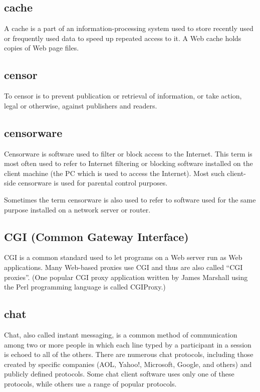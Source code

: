 \subsection{cache}

A cache is a part of an information-processing system used to store
recently used or frequently used data to speed up repeated access to it.
A Web cache holds copies of Web page files.

\subsection{censor}

To censor is to prevent publication or retrieval of information, or take
action, legal or otherwise, against publishers and readers.

\subsection{censorware}

Censorware is software used to filter or block access to the Internet.
This term is most often used to refer to Internet filtering or blocking
software installed on the client machine (the PC which is used to access
the Internet). Most such client-side censorware is used for parental
control purposes.

Sometimes the term censorware is also used to refer to software used for
the same purpose installed on a network server or router.

\subsection{CGI (Common Gateway Interface)}

CGI is a common standard used to let programs on a Web server run as Web
applications. Many Web-based proxies use CGI and thus are also called
``CGI proxies''. (One popular CGI proxy application written by James
Marshall using the Perl programming language is called CGIProxy.)

\subsection{chat}

Chat, also called instant messaging, is a common method of communication
among two or more people in which each line typed by a participant in a
session is echoed to all of the others. There are numerous chat
protocols, including those created by specific companies (AOL, Yahoo!,
Microsoft, Google, and others) and publicly defined protocols. Some chat
client software uses only one of these protocols, while others use a
range of popular protocols.

